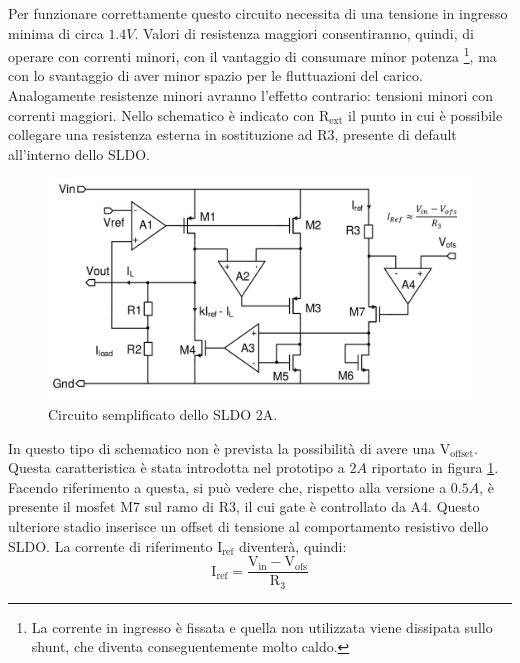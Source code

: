 Per funzionare correttamente questo circuito necessita di una tensione in ingresso minima di circa $1.4V$.
Valori di resistenza maggiori consentiranno, quindi, di operare con correnti minori, con il vantaggio di consumare minor potenza
\footnote{
  La corrente in ingresso è fissata e quella non utilizzata viene dissipata sullo shunt, che diventa conseguentemente molto caldo.
},
ma con lo svantaggio di aver minor spazio per le fluttuazioni del carico. 
Analogamente resistenze minori avranno l'effetto contrario: tensioni minori con correnti maggiori.
Nello schematico è indicato con $\mathrm{R_{ext}}$ il punto in cui è possibile collegare una resistenza esterna in sostituzione ad R3, presente di default all'interno dello SLDO.
\begin{figure}
\centering
\includegraphics[width=\linewidth]{Immagini/SLDO2A}
\caption{Circuito semplificato dello SLDO 2A.}
\label{SLDO2A}
\end{figure}
In questo tipo di schematico non è prevista la possibilità di avere una $\mathrm{V_{offset}}$.
Questa caratteristica è stata introdotta nel prototipo a $2A$ riportato in figura \ref{SLDO2A}.
Facendo riferimento a questa, si può vedere che, rispetto alla versione a $0.5A$, è presente il mosfet M7 sul ramo di R3, il cui gate è controllato da A4.
Questo ulteriore stadio inserisce un offset di tensione al comportamento resistivo dello SLDO. La corrente di riferimento $\mathrm{I_{ref}}$ diventerà, quindi:
\begin{equation}
\mathrm{I_{ref} = \frac{V_{in} - V_{ofs}}{R_3}}
\end{equation}



